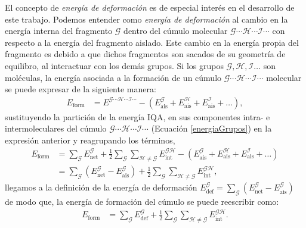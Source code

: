 El concepto de \textit{energía de deformación} es de especial interés en el
desarrollo de este trabajo. Podemos entender como \textit{energía de
deformación} al cambio en la energía interna del fragmento $\mathscr{G}$ dentro
del cúmulo molecular  $\mathscr{G}\cdots\mathscr{H}\cdots\mathscr{I}\cdots$ con
respecto a la energía del fragmento aislado. Este cambio en la energía propia
del fragmento es debido a que dichos fragmentos son sacados de su geometría de
equilibro, al interactuar con los demás grupos. Si los grupos $\mathscr{G},
\mathscr{H}, \mathscr{I} \ldots$ son moléculas, la energía asociada a la
formación de un cúmulo $\mathscr{G}\cdots\mathscr{H}\cdots\mathscr{I}\cdots$
molecular se puede expresar de la siguiente manera:
%
\begin{align} 
E_{\mathrm{form}} &= E^{\mathscr{G}\cdots\mathscr{H}\cdots\mathscr{I}\cdots} 
   -\left(E^{\mathscr{G}}_{\mathrm{ais}} + E^{\mathscr{H}}_{\mathrm{ais}} + E^{\mathscr{I}}_{\mathrm{ais}}
   +\ldots \right) ,
\end{align}
\noindent sustituyendo la partición de la energía IQA, en sus componentes
intra- e intermoleculares del cúmulo
$\mathscr{G}\cdots\mathscr{H}\cdots\mathscr{I}\cdots$ (Ecuación
\ref{energiaGrupos}) en la expresión anterior y reagrupando los términos,
\begin{align}
E_{\mathrm{form}} &= \sum_{\mathscr{G}} E^{\mathscr{G}}_{\mathrm{net}} + \frac{1}{2}
    \sum_{\mathscr{G}} \sum_{\mathscr{H} \neq \mathscr{G}}
    E_{\mathrm{int}}^{\mathscr{GH}} - \left( E^{\mathscr{G}}_{\mathrm{ais}} 
   +E^{\mathscr{H}}_{\mathrm{ais}} + E^{\mathscr{I}}_{\mathrm{ais}} + \ldots \right) \nonumber \\
 &= \sum_{\mathscr{G}} (E^{\mathscr{G}}_{\mathrm{net}} - E^{\mathscr{G}}_{\mathrm{ais}}) 
   +\frac{1}{2} \sum_{\mathscr{G}} \sum_{\mathscr{H} \neq \mathscr{G}}
    E_{\mathrm{int}}^{\mathscr{GH}} ,
\end{align}
 \noindent llegamos a la definición de la energía de deformación $E^{\mathscr{G}}_{\mathrm{def}}=\sum_{\mathscr{G}} (E^{\mathscr{G}}_{\mathrm{net}} - E^{\mathscr{G}}_{\mathrm{ais}})$ de modo que, la energía de formación del cúmulo se puede reescribir como:
\begin{align}
E_{\mathrm{form}} &= \sum_{\mathscr{G}} E^{\mathscr{G}}_{\mathrm{def}}
   +\frac{1}{2} \sum_{\mathscr{G}} \sum_{\mathscr{H} \neq \mathscr{G}} 
    E_{\mathrm{int}}^{\mathscr{GH}}. \label{defInt}
\end{align} 

